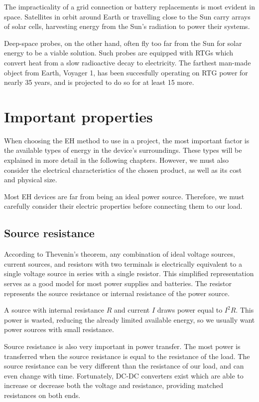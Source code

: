 \documentclass[a4paper,10pt]{article}
\begin{document}
The impracticality of a grid connection or battery replacements is most evident in space. Satellites in orbit around Earth or travelling close to the Sun carry arrays of solar cells, harvesting energy from the Sun's radiation to power their systems. 

Deep-space probes, on the other hand, often fly too far from the Sun for solar energy to be a viable solution. Such probes are equipped with \acp{RTG} which convert heat from a slow radioactive decay to electricity. The farthest man-made object from Earth, Voyager 1, has been succesfully operating on \ac{RTG} power for nearly 35 years, and is projected to do so for at least 15 more. 

\section{Important properties}

When choosing the \ac{EH} method to use in a project, the most important factor is the available types of energy in the device's surroundings. These types will be explained in more detail in the following chapters. However, we must also consider the electrical characteristics of the chosen product, as well as its cost and physical size. 

Most \ac{EH} devices are far from being an ideal power source. Therefore, we must carefully consider their electric properties before connecting them to our load. 

\subsection{Source resistance}

According to Thevenin's theorem, any combination of ideal voltage sources, current sources, and resistors with two terminals is electrically equivalent to a single voltage source in series with a single resistor. This simplified representation serves as a good model for most power supplies and batteries. The resistor represents the source resistance or internal resistance of the power source. 

A source with internal resistance $R$ and current $I$ draws power equal to $I^2 R$. This power is wasted, reducing the already limited available energy, so we usually want power sources with small resistance. 

Source resistance is also very important in power transfer. The most power is transferred when the source resistance is equal to the resistance of the load. The source resistance can be very different than the resistance of our load, and can even change with time. Fortunately, DC-DC converters exist which are able to increase or decrease both the voltage and resistance, providing matched resistances on both ends. 
\end{document}
